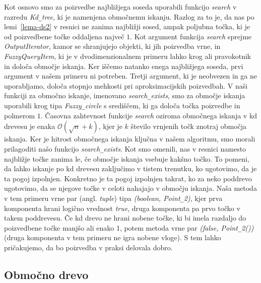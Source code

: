 \documentclass[a4paper, 12pt]{book}
\newcommand{\OO}{\ensuremath{\mathcal{O}}} %
\newcommand{\U}{\texttt{\_}}
\begin{document}
Kot osnovo smo za poizvedbe najbližjega soseda uporabili funkcijo \textit{search} v razredu \textit{Kd\U tree}, ki je namenjena območnemu iskanju. Razlog za to je, da nas po lemi~\ref{lema-ds2} v resnici ne zanima najbližji sosed, ampak poljubna točka, ki je od poizvedbene točke oddaljena največ $1$. Kot argument funkcija \textit{search} sprejme \textit{OutputIterator}, kamor se shranjujejo objekti, ki jih poizvedba vrne, in \textit{FuzzyQueryItem}, ki je v dvodimenzionalnem primeru lahko krog ali pravokotnik in določa območje iskanja. Ker iščemo natanko enega najbližjega soseda, prvi argument v našem primeru ni potreben. Tretji argument, ki je neobvezen in ga ne uporabljamo, določa stopnjo mehkosti pri aproksimacijskih poizvedbah. V naši funkciji za območno iskanje, imenovano \textit{search\U exists}, smo za območje iskanja uporabili krog tipa \textit{Fuzzy\U circle} s središčem, ki ga določa točka poizvedbe in polmerom $1$. Časovna zahtevnost funkcije \textit{search} oziroma območnega iskanja v kd drevesu je enaka $\OO(\sqrt{n} + k)$, kjer je $k$ število vrnjenih točk znotraj območja iskanja. Ker je hitrost območnega iskanja ključna v našem algoritmu, smo morali prilagoditi našo funkcijo \textit{search\U exists}. Kot smo omenili, nas v resnici namesto najbližje točke zanima le, če območje iskanja vsebuje kakšno točko. To pomeni, da lahko iskanje po kd drevesu zaključimo v tistem trenutku, ko ugotovimo, da je ta pogoj izpolnjen. Konkretno je ta pogoj izpolnjen takrat, ko za neko poddrevo ugotovimo, da se njegove točke v celoti nahajajo v območju iskanja. Naša metoda v tem primeru vrne par (angl. \textit{tuple}) tipa \textit{(boolean, Point\U 2)}, kjer prva komponenta hrani logično vrednost \textit{true}, druga komponenta pa prvo točko v takem poddrevesu. Če kd drevo ne hrani nobene točke, ki bi imela razdaljo do poizvedbene točke manjšo ali enako 1, potem metoda vrne par \textit{(false, Point\U 2())} (druga komponenta v tem primeru ne igra nobene vloge). S tem lahko pričakujemo, da bo poizvedba v praksi delovala dobro.

\subsection{Območno drevo}
\end{document}
